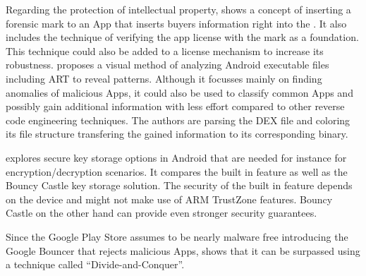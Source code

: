 Regarding the protection of intellectual property, \parencite{forensic_mark}
shows a concept of inserting a forensic mark to an App that inserts buyers 
information right into the . It also includes the technique
of verifying the app license with the mark as a foundation. This technique could
also be added to a license mechanism to increase its robustness.
\parencite{visual_exploration} proposes a visual method of analyzing Android
executable files including ART to reveal patterns. Although it focusses mainly
on finding anomalies of malicious Apps, it could also be used to classify 
common Apps and possibly gain additional information with less effort compared
to other reverse code engineering techniques. The authors are parsing the
DEX file and coloring its file structure transfering the gained information
to its corresponding binary. 

\parencite{key_storage} explores secure key storage options in Android that are needed for instance for encryption/decryption scenarios. It compares the built in
feature as well as the Bouncy Castle key storage solution. The security of the 
built in feature depends on the device and might not make use of ARM
TrustZone features. Bouncy Castle on the other hand can provide even stronger 
security guarantees.

Since the Google Play Store assumes to be nearly malware free introducing the Google Bouncer that rejects malicious Apps, \parencite{divide_and_conquer}
shows that it can be surpassed using a technique called ``Divide-and-Conquer''.





